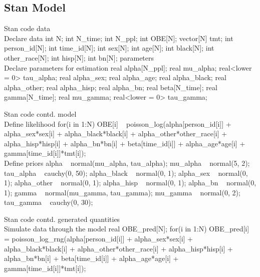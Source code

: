 \documentclass{article}
\begin{document}
\subsection*{Stan Model}
\begin{sexylisting}{Stan code}
data{\\ Declare data
  int N;
  int N_time;
  int N_ppl;
  int OBE[N];
  vector[N] tmt;
  int person_id[N];
  int time_id[N];
  int sex[N];
  int age[N];
  int black[N];
  int other_race[N];
  int hisp[N];
  int bn[N];
}
parameters{\\ Declare parameters for estimation
  real alpha[N_ppl];
  real mu_alpha;
  real<lower = 0> tau_alpha;
  real alpha_sex;
  real alpha_age;
  real alpha_black;
  real alpha_other;
  real alpha_hisp;
  real alpha_bn;
  real beta[N_time];
  real gamma[N_time];
  real mu_gamma;
  real<lower = 0> tau_gamma;
}
\end{sexylisting}
\begin{sexylisting}{Stan code contd.}
model{
  \\ Define likelihood
  for(i in 1:N) {
    OBE[i] ~ poisson_log(alpha[person_id[i]] + alpha_sex*sex[i] 
                         + alpha_black*black[i] 
                         + alpha_other*other_race[i]
                         + alpha_hisp*hisp[i] + alpha_bn*bn[i]
                         + beta[time_id[i]] + alpha_age*age[i]
                         + gamma[time_id[i]]*tmt[i]);
  }
  \\ Define priors
  alpha ~ normal(mu_alpha, tau_alpha);
  mu_alpha ~ normal(5, 2);
  tau_alpha ~ cauchy(0, 50);
  alpha_black ~ normal(0, 1);
  alpha_sex ~ normal(0, 1);
  alpha_other ~ normal(0, 1);
  alpha_hisp ~ normal(0, 1);
  alpha_bn ~ normal(0, 1);
  gamma ~ normal(mu_gamma, tau_gamma);
  mu_gamma ~ normal(0, 2);
  tau_gamma ~ cauchy(0, 30);
}
\end{sexylisting}
\begin{sexylisting}{Stan code contd.}
generated quantities{
  \\ Simulate data through the model
  real OBE_pred[N];
  for(i in 1:N) {
    OBE_pred[i] = poisson_log_rng(alpha[person_id[i]] 
                                  + alpha_sex*sex[i] 
                                  + alpha_black*black[i] 
                                  + alpha_other*other_race[i]
                                  + alpha_hisp*hisp[i] 
                                  + alpha_bn*bn[i]
                                  + beta[time_id[i]] 
                                  + alpha_age*age[i]
                                  + gamma[time_id[i]]*tmt[i]);
  }
}
\end{sexylisting}
\end{document}
